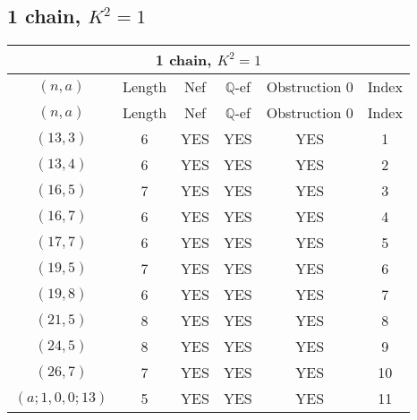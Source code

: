 \subsection{1 chain, $K^2 = 1$}
\begin{longtable}{|c|c|c|c|c|c|}
\hline
\multicolumn{6}{|c|}{1 chain, $K^2 = 1$}\\
\hline
$(n,a)$ & Length & Nef & $\mathbb Q$-ef & Obstruction 0 & Index\\
\hline
\endfirsthead

\hline
$(n,a)$ & Length & Nef & $\mathbb Q$-ef & Obstruction 0 & Index\\
\hline
\endhead
\hline
\endfoot

$(13, 3)$ & 6 & YES & YES & YES & 1\\
$(13, 4)$ & 6 & YES & YES & YES & 2\\
$(16, 5)$ & 7 & YES & YES & YES & 3\\
$(16, 7)$ & 6 & YES & YES & YES & 4\\
$(17, 7)$ & 6 & YES & YES & YES & 5\\
$(19, 5)$ & 7 & YES & YES & YES & 6\\
$(19, 8)$ & 6 & YES & YES & YES & 7\\
$(21, 5)$ & 8 & YES & YES & YES & 8\\
$(24, 5)$ & 8 & YES & YES & YES & 9\\
$(26, 7)$ & 7 & YES & YES & YES & 10\\
$(a; 1, 0, 0; 13)$ & 5 & YES & YES & YES & 11
\end{longtable}
